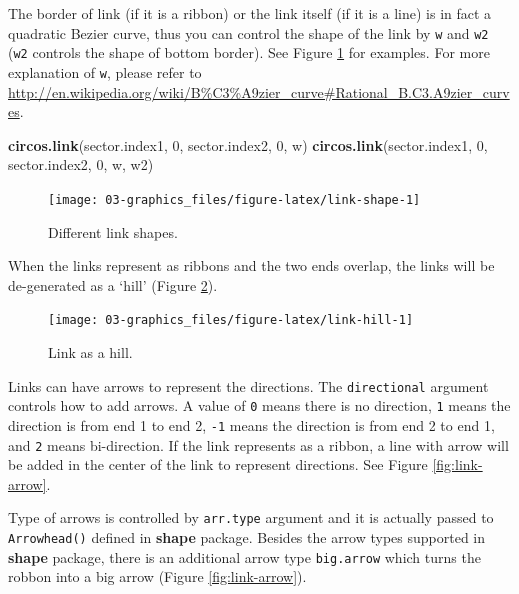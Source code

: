 \documentclass[]{book}
\newenvironment{Shaded}{\begin{snugshade}}{\end{snugshade}}
\newcommand{\KeywordTok}[1]{\textcolor[rgb]{0.13,0.29,0.53}{\textbf{#1}}}
\newcommand{\DecValTok}[1]{\textcolor[rgb]{0.00,0.00,0.81}{#1}}
\newcommand{\NormalTok}[1]{#1}
\theoremstyle{definition}
\theoremstyle{definition}
\theoremstyle{remark}
\begin{document}
The border of link (if it is a ribbon) or the link itself (if it is a
line) is in fact a quadratic Bezier curve, thus you can control the
shape of the link by \texttt{w} and \texttt{w2} (\texttt{w2} controls
the shape of bottom border). See Figure \ref{fig:link-shape} for
examples. For more explanation of \texttt{w}, please refer to
\url{http://en.wikipedia.org/wiki/B\%C3\%A9zier_curve\#Rational_B.C3.A9zier_curves}.

\begin{Shaded}
\begin{Highlighting}[]
\KeywordTok{circos.link}\NormalTok{(sector.index1, }\DecValTok{0}\NormalTok{, sector.index2, }\DecValTok{0}\NormalTok{, w)}
\KeywordTok{circos.link}\NormalTok{(sector.index1, }\DecValTok{0}\NormalTok{, sector.index2, }\DecValTok{0}\NormalTok{, w, w2)}
\end{Highlighting}
\end{Shaded}

\begin{figure}

{\centering \texttt{[image: 03-graphics\_files/figure-latex/link-shape-1]} 

}

\caption{Different link shapes.}\label{fig:link-shape}
\end{figure}

When the links represent as ribbons and the two ends overlap, the links
will be de-generated as a `hill' (Figure \ref{fig:link-hill}).

\begin{figure}

{\centering \texttt{[image: 03-graphics\_files/figure-latex/link-hill-1]} 

}

\caption{Link as a hill.}\label{fig:link-hill}
\end{figure}

Links can have arrows to represent the directions. The
\texttt{directional} argument controls how to add arrows. A value of
\texttt{0} means there is no direction, \texttt{1} means the direction
is from end 1 to end 2, \texttt{-1} means the direction is from end 2 to
end 1, and \texttt{2} means bi-direction. If the link represents as a
ribbon, a line with arrow will be added in the center of the link to
represent directions. See Figure \ref{fig:link-arrow}.

Type of arrows is controlled by \texttt{arr.type} argument and it is
actually passed to \texttt{Arrowhead()} defined in \textbf{shape}
package. Besides the arrow types supported in \textbf{shape} package,
there is an additional arrow type \texttt{big.arrow} which turns the
robbon into a big arrow (Figure \ref{fig:link-arrow}).
\end{document}

